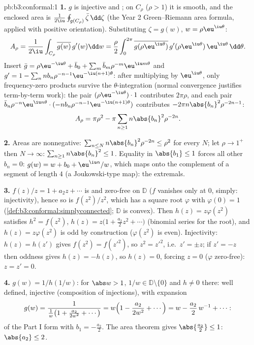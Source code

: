 \begin{solution}{pb:b3:conformal:1}
\textbf{1.} $g$ is injective and ; on $C_\rho$
($\rho > 1$) it is smooth, and the enclosed area is
$\frac1{2\iu}\oint_{g(C_\rho)}\bar\zeta\,\dd\zeta$ (the Year 2
Green--Riemann area formula, applied with positive
orientation). Substituting $\zeta = g(w)$, $w =
\rho\eu^{\iu\theta}$:
\[
A_\rho = \frac1{2\iu}\int_{C_\rho}\overline{g(w)}\,g'(w)\dd
w = \frac\rho2\int_0^{2\pi}\overline{g(\rho\eu^{\iu\theta})}
\,g'(\rho\eu^{\iu\theta})\,\eu^{\iu\theta}\,\dd\theta .
\]
Insert $\bar g = \rho\eu^{-\iu\theta} + \bar b_0 +
\sum_m\bar b_m\rho^{-m}\eu^{\iu m\theta}$ and $g' = 1 -
\sum_nnb_n\rho^{-n-1}\eu^{-\iu(n+1)\theta}$: after
multiplying by $\eu^{\iu\theta}$, only frequency-zero
products survive the $\theta$-integration (normal
convergence justifies term-by-term work): the pair
$(\rho\eu^{-\iu\theta})\cdot1$ contributes $2\pi\rho$, and
each pair $\bar b_n\rho^{-n}\eu^{\iu
n\theta}\cdot(-nb_n\rho^{-n-1}\eu^{-\iu(n+1)\theta})$
contributes $-2\pi n\abs{b_n}^2\rho^{-2n-1}$:
\[
A_\rho = \pi\rho^2 - \pi\sum_{n\geq1}n\abs{b_n}^2\rho^{-2n}.
\]

\textbf{2.} Areas are nonnegative: $\sum_{n\leq
N}n\abs{b_n}^2\rho^{-2n} \leq \rho^2$ for every $N$; let
$\rho \to 1^+$ then $N \to \infty$:
$\sum_{n\geq1}n\abs{b_n}^2 \leq 1$. Equality in $\abs{b_1}
\leq 1$ forces all other $b_n = 0$: $g(w) = w + b_0 +
\eu^{\iu\alpha}/w$, which maps onto the complement of a
segment of length $4$ (a Joukowski-type map): the extremals.

\textbf{3.} $f(z)/z = 1 + a_2z + \cdots$ is  and
zero-free on $\mathbb D$ ($f$ vanishes only at $0$, simply:
injectivity), hence so is $f(z^2)/z^2$, which has a
 square root $\varphi$ with $\varphi(0) = 1$
(\cref{def:b3:conformal:simplyconnected}; $\mathbb D$ is
convex). Then $h(z) = z\varphi(z^2)$ satisfies $h^2 =
f(z^2)$, $h(z) = z\bigl(1 + \frac{a_2}2z^2 + \cdots\bigr)$
(binomial series for the root), and $h(z) = z\varphi(z^2)$ is
odd by construction ($\varphi(z^2)$ is even). Injectivity: $h(z) = h(z')$ gives $f(z^2) =
f(z'^2)$, so $z^2 = z'^2$, i.e.\ $z' = \pm z$; if $z' = -z$
then oddness gives $h(z) = -h(z)$, so $h(z) = 0$, forcing $z
= 0$ ($\varphi$ zero-free): $z = z' = 0$.

\textbf{4.} $g(w) = 1/h(1/w)$: for $\abs w > 1$, $1/w \in
\mathbb D\setminus\{0\}$ and $h \neq 0$ there: well defined,
injective (composition of injections), with expansion
\[
g(w) = \frac{1}{\frac1w\bigl(1 + \frac{a_2}{2w^2} +
\cdots\bigr)} = w\Bigl(1 - \frac{a_2}{2w^2} + \cdots\Bigr)
= w - \frac{a_2}{2}\,w^{-1} + \cdots :
\]
of the Part I form with $b_1 = -\frac{a_2}2$. The area theorem
gives $\abs{\frac{a_2}2} \leq 1$: $\abs{a_2} \leq 2$.


\end{solution}

